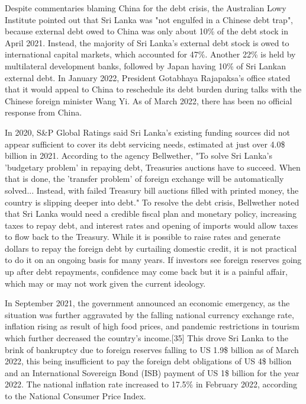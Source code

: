 \documentclass[a4paper,12pt]{article}
\begin{document}
Despite commentaries blaming China for the debt crisis, the Australian Lowy Institute pointed out that Sri Lanka was "not engulfed in a Chinese debt trap", because external debt owed to China was only about 10\% of the debt stock in April 2021. Instead, the majority of Sri Lanka's external debt stock is owed to international capital markets, which accounted for 47\%. Another 22\% is held by multilateral development banks, followed by Japan having 10\% of Sri Lankan external debt. In January 2022, President Gotabhaya Rajapaksa's office stated that it would appeal to China to reschedule its debt burden during talks with the Chinese foreign minister Wang Yi. As of March 2022, there has been no official response from China.\newline

In 2020, S\&P Global Ratings said Sri Lanka's existing funding sources did not appear sufficient to cover its debt servicing needs, estimated at just over 4.0\$ billion in 2021. According to the agency Bellwether, "To solve Sri Lanka's 'budgetary problem' in repaying debt, Treasuries auctions have to succeed. When that is done, the 'transfer problem' of foreign exchange will be automatically solved... Instead, with failed Treasury bill auctions filled with printed money, the country is slipping deeper into debt." To resolve the debt crisis, Bellwether noted that Sri Lanka would need a credible fiscal plan and monetary policy, increasing taxes to repay debt, and interest rates and opening of imports would allow taxes to flow back to the Treasury. While it is possible to raise rates and generate dollars to repay the foreign debt by curtailing domestic credit, it is not practical to do it on an ongoing basis for many years. If investors see foreign reserves going up after debt repayments, confidence may come back but it is a painful affair, which may or may not work given the current ideology.

In September 2021, the government announced an economic emergency, as the situation was further aggravated by the falling national currency exchange rate, inflation rising as result of high food prices, and pandemic restrictions in tourism which further decreased the country's income.[35] This drove Sri Lanka to the brink of bankruptcy due to foreign reserves falling to US 1.9\$ billion as of March 2022, this being insufficient to pay the foreign debt obligations of US 4\$ billion and an International Sovereign Bond (ISB) payment of US 1\$ billion for the year 2022. The national inflation rate increased to 17.5\% in February 2022, according to the National Consumer Price Index.
\end{document}
